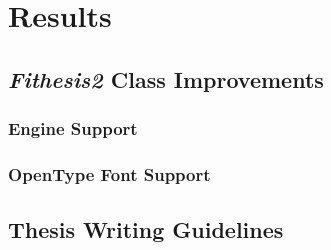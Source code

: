 \chapter{Results}
  \blindtext

  \section{\emph{Fithesis2} Class Improvements}  
  \blindtext

    \subsection{ Engine Support} 
    \blindtext

    \subsection{OpenType Font Support} 
    \blindtext

  \section{Thesis Writing Guidelines} 
  \blindtext
